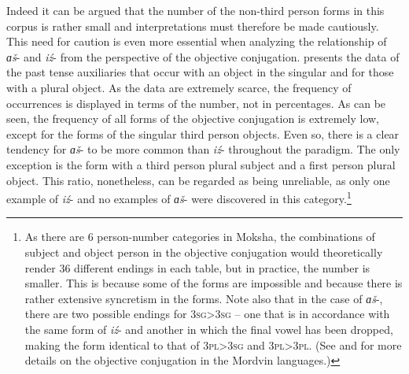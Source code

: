\documentclass[output=paper]{langsci/langscibook}
\begin{document}
  Indeed it can be argued that the number of the non-third person forms in this corpus is rather small and interpretations must therefore be made cautiously. This need for caution is even more essential when analyzing the relationship of \textit{ɑš}- and \textit{iź}- from the perspective of the objective conjugation.  presents the data of the past tense auxiliaries that occur with an object in the singular and  for those with a plural object. As the data are extremely scarce, the frequency of occurrences is displayed in terms of the number, not in percentages. As can be seen, the frequency of all forms of the objective conjugation is extremely low, except for the forms of the singular third person objects. Even so, there is a clear tendency for \textit{ɑš}- to be more common than \textit{iź}- throughout the paradigm. The only exception is the form with a third person plural subject and a first person plural object. This ratio, nonetheless, can be regarded as being unreliable, as only one example of \textit{iź}- and no examples of \textit{ɑš}- were discovered in this category.\footnote{As there are 6 person-number categories in Moksha, the combinations of subject and object person in the objective conjugation would theoretically render 36 different endings in each table, but in practice, the number is smaller. This is because some of the forms are impossible and because there is rather extensive syncretism in the forms. Note also that in the case of \textit{ɑš}-, there are two possible endings for \textsc{3sg>3sg} -- one that is in accordance with the same form of \textit{iź}- and another in which the final vowel has been dropped, making the form identical to that of \textsc{3pl>3sg} and \textsc{3pl>3pl}. (See \citealt{Trosterud1994} and \citealt{Keresztes1999} for more details on the objective conjugation in the Mordvin languages.)}
\end{document}
